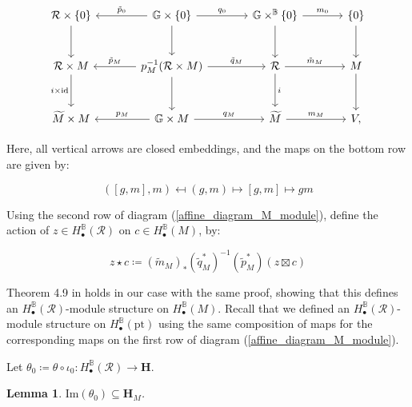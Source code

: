 \documentclass[11pt]{article}
\newcommand{\R}{\mathcal{R}}
\renewcommand{\H}{\textbf{H}}
\newcommand{\bbG}{\mathbb{G}}
\newcommand{\bbB}{\mathbb{B}}
\newcommand{\1}{\mathbb{1}}
\newcommand{\HBM}[2]{H_\bullet^{#1}(#2)}
\newcommand{\tM}{\widetilde{M}}
\newcommand{\pt}{\text{pt}}
\renewcommand{\subset}{\subseteq}
\renewcommand{\Im}{\text{Im}}
\newtheorem{lemma}[theorem]{Lemma}
\theoremstyle{definition}
\numberwithin{equation}{section}
\begin{document}
\begin{equation}
\label{affine_diagram_M_module}
\begin{tikzcd}[column sep=large, row sep=large]
\mathcal{R} \times \{0\} \arrow[d] & \bbG \times \{ 0 \} \arrow[l, "\tilde{p}_0"{above}] \arrow[r, "q_0"] \arrow[d] & \bbG \times^{\bbB} \{ 0 \} \arrow[r, "m_0"] \arrow[d] & \{ 0 \} \arrow[d] \\
\mathcal{R} \times M \arrow[d, "i \times \text{id}"{left}] & p_M^{-1} (\R \times M) \arrow[l, "\tilde{p}_M"{above}] \arrow[r, "\tilde{q}_M"] \arrow[d] & \R \arrow[r, "\tilde{m}_M"] \arrow[d, "i"] & M \arrow[d] \\
\tM \times M & \bbG \times M \arrow[l, "p_M"{above}] \arrow[r, "q_M"{above}] & \tM \arrow[r, "m_M"{above}] & V,
\end{tikzcd}
\end{equation}

Here, all vertical arrows are closed embeddings, and the maps on the bottom row are given by:

$$([g, m], m) \mapsfrom (g, m) \mapsto [g, m] \mapsto gm$$

Using the second row of diagram (\ref{affine_diagram_M_module}), define the action of $z\in \HBM{\bbB}{\R}$ on $c \in \HBM{\bbB}{M}$, by:

\begin{equation}
\label{affine_H(R)_on_H(M)_action}
z\star c \coloneqq (\tilde{m}_M)_* (\tilde{q}_M^*)^{-1}({\tilde{p}_M^*})(z \boxtimes c)
\end{equation}

Theorem 4.9 in \cite{HKW} holds in our case with the same proof, showing that this defines an $\HBM{\bbB}{\R}$-module structure on $\HBM{\bbB}{M}$. Recall that we defined an $\HBM{\bbB}{\R}$-module structure on $\HBM{\bbB}{\pt}$ using the same composition of maps for the corresponding maps on the first row of diagram (\ref{affine_diagram_M_module}).

Let $\theta_0 \coloneqq \theta \circ\iota_0: \HBM{\bbB}{\R}\rightarrow \H$.

\begin{lemma}
\label{affine_Image_in_HM}
    $\Im(\theta_0) \subset \H_M$.
\end{lemma}
\end{document}
